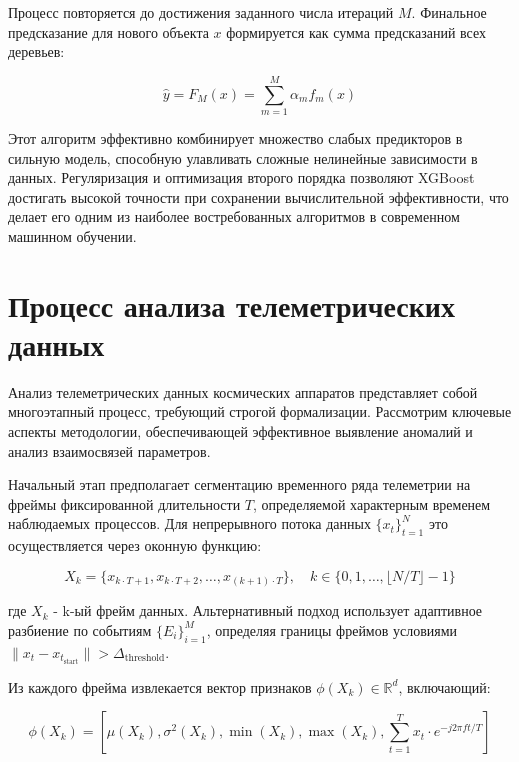 Процесс повторяется до достижения заданного числа итераций $M$. Финальное
предсказание для нового объекта $x$ формируется как сумма предсказаний всех
деревьев:

\[\hat{y} = F_M(x) = \sum_{m=1}^M \alpha_m f_m(x)\]

Этот алгоритм эффективно комбинирует множество слабых предикторов в сильную
модель, способную улавливать сложные нелинейные зависимости в данных.
Регуляризация и оптимизация второго порядка позволяют XGBoost достигать высокой
точности при сохранении вычислительной эффективности, что делает его одним из
наиболее востребованных алгоритмов в современном машинном обучении.

\section{Процесс анализа телеметрических данных}

Анализ телеметрических данных космических аппаратов представляет собой
многоэтапный процесс, требующий строгой формализации. Рассмотрим ключевые
аспекты методологии, обеспечивающей эффективное выявление аномалий и анализ
взаимосвязей параметров.

Начальный этап предполагает сегментацию временного ряда телеметрии на фреймы
фиксированной длительности $T$, определяемой характерным временем наблюдаемых
процессов. Для непрерывного потока данных $\{x_t\}_{t=1}^N$ это осуществляется
через оконную функцию:

\[
	X_k = \{x_{k \cdot T + 1}, x_{k \cdot T + 2}, \ldots, x_{(k+1) \cdot T}\}, \quad k \in \{0, 1, \ldots, \lfloor N/T \rfloor - 1\}
\]

где $X_k$ - k-ый фрейм данных. Альтернативный подход использует адаптивное
разбиение по событиям $\{E_i\}_{i=1}^M$, определяя границы фреймов условиями
$\|x_t - x_{t_{\text{start}}}\| > \Delta_{\text{threshold}}$.

Из каждого фрейма извлекается вектор признаков $\phi(X_k) \in \mathbb{R}^d$, включающий:

\[
	\phi(X_k) = \left[\mu(X_k), \sigma^2(X_k), \min(X_k), \max(X_k), \sum_{t=1}^T x_t \cdot e^{-j2\pi ft/T}\right]
\]

